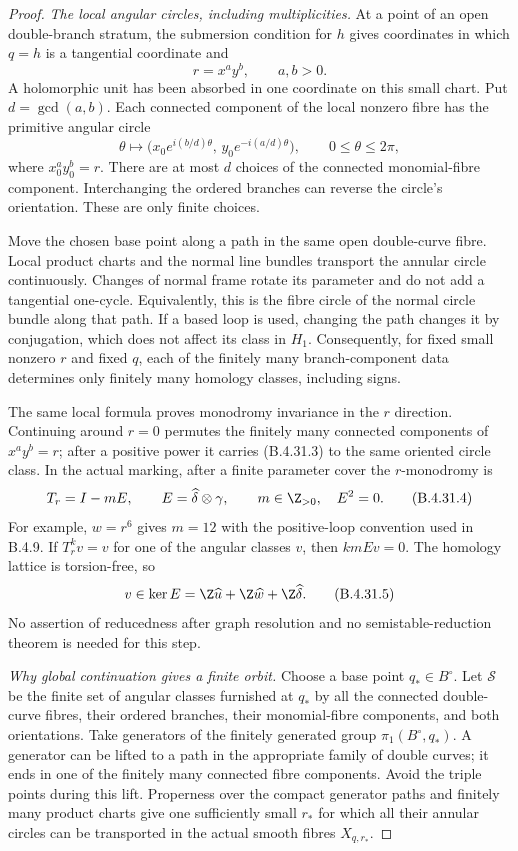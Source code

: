 \begin{proof}
\emph{The local angular circles, including multiplicities.}
At a point of an open double-branch stratum, the submersion
condition for $h$ gives coordinates in which $q=h$ is a
tangential coordinate and
\[
                 r=x^a y^b,\qquad a,b>0.
 \tag{B.4.31.2}
\]
A holomorphic unit has been absorbed in one coordinate on this
small chart. Put $d=\gcd(a,b)$. Each connected component of the
local nonzero fibre has the primitive angular circle
\[
 \theta\longmapsto
 \bigl(x_0e^{i(b/d)\theta},\,
       y_0e^{-i(a/d)\theta}\bigr),
       \qquad 0\le\theta\le2\pi,
 \tag{B.4.31.3}
\]
where $x_0^a y_0^b=r$. There are at most $d$ choices of the
connected monomial-fibre component. Interchanging the ordered
branches can reverse the circle's orientation. These are only
finite choices.

Move the chosen base point along a path in the same open
double-curve fibre. Local product charts and the normal line
bundles transport the annular circle continuously. Changes of
normal frame rotate its parameter and do not add a tangential
one-cycle. Equivalently, this is the fibre circle of the normal
circle bundle along that path. If a based loop is used, changing
the path changes it by conjugation, which does not affect its
class in $H_1$. Consequently, for fixed small nonzero $r$ and
fixed $q$, each of the finitely many branch-component data
determines only finitely many homology classes, including signs.

The same local formula proves monodromy invariance in the
$r$ direction. Continuing around $r=0$ permutes the finitely
many connected components of $x^a y^b=r$; after a positive
power it carries (B.4.31.3) to the same oriented circle class.
In the actual marking, after a finite parameter cover the
$r$-monodromy is
\[
 T_r=I-mE,\qquad
 E=\widehat\delta\otimes\gamma,\qquad m\in\Z_{>0},
 \quad E^2=0.
 \tag{B.4.31.4}
\]
For example, $w=r^6$ gives $m=12$ with the positive-loop
convention used in B.4.9. If $T_r^k v=v$ for one of the
angular classes $v$, then $kmEv=0$. The homology lattice is
torsion-free, so
\[
 v\in\ker E
    =\Z\widehat u+\Z\widehat w+\Z\widehat\delta.
 \tag{B.4.31.5}
\]
No assertion of reducedness after graph resolution and no
semistable-reduction theorem is needed for this step.

\emph{Why global continuation gives a finite orbit.}
Choose a base point $q_*\in B^\circ$. Let $\mathscr S$ be the
finite set of angular classes furnished at $q_*$ by all the
connected double-curve fibres, their ordered branches, their
monomial-fibre components, and both orientations.
Take generators of the finitely generated group
$\pi_1(B^\circ,q_*)$. A generator can be lifted to a path in
the appropriate family of double curves; it ends in one of
the finitely many connected fibre components. Avoid the
triple points during this lift. Properness over the compact
generator paths and finitely many product charts give one
sufficiently small $r_*$ for which all their annular circles
can be transported in the actual smooth fibres
$X_{q,r_*}$.


\end{proof}
